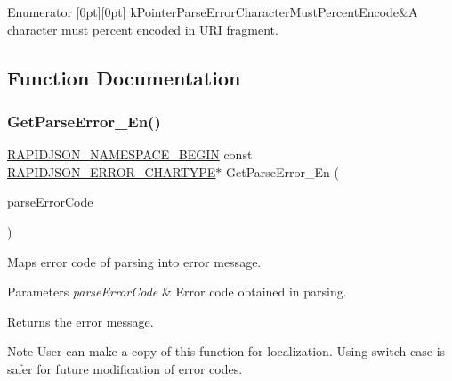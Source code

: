 \begin{DoxyEnumFields}{Enumerator}
[0pt][0pt]{}\mbox{\label{a00635_ggacb2e274f33e54d91b96e9883a99a98beabd7eae93627f74267009a03679b6dc38}} 
k\+Pointer\+Parse\+Error\+Character\+Must\+Percent\+Encode&A character must percent encoded in U\+RI fragment. \\
\hline

\end{DoxyEnumFields}


\subsection{Function Documentation}
\mbox{\label{a00635_ga755b523205f46c980c80d12e230a3abd}} 
\subsubsection{\texorpdfstring{Get\+Parse\+Error\+\_\+\+En()}{GetParseError\_En()}}
{\footnotesize\ttfamily \hyperlink{a00636_gad3806c8251fdc7da9618b7e922674ffc}{R\+A\+P\+I\+D\+J\+S\+O\+N\+\_\+\+N\+A\+M\+E\+S\+P\+A\+C\+E\+\_\+\+B\+E\+G\+IN} const \hyperlink{a00635_ga7e4636fd48d0148f102b8a13f0539d8c}{R\+A\+P\+I\+D\+J\+S\+O\+N\+\_\+\+E\+R\+R\+O\+R\+\_\+\+C\+H\+A\+R\+T\+Y\+PE}$\ast$ Get\+Parse\+Error\+\_\+\+En (\begin{DoxyParamCaption}\item[{\hyperlink{a00635_ga8d4b32dfc45840bca189ade2bbcb6ba7}{Parse\+Error\+Code}}]{parse\+Error\+Code }\end{DoxyParamCaption})\hspace{0.3cm}{\ttfamily [inline]}}



Maps error code of parsing into error message. 


\begin{DoxyParams}{Parameters}
{\em parse\+Error\+Code} & Error code obtained in parsing. \\
\hline
\end{DoxyParams}
\begin{DoxyReturn}{Returns}
the error message. 
\end{DoxyReturn}
\begin{DoxyNote}{Note}
User can make a copy of this function for localization. Using switch-\/case is safer for future modification of error codes. 
\end{DoxyNote}
